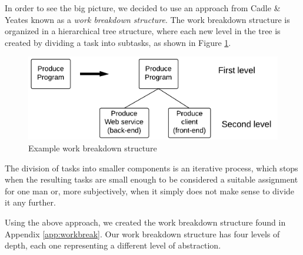 In order to see the big picture, we decided to use an approach from Cadle \& Yeates\cite[ch.~8.3.1]{caye} known as a \emph{work breakdown structure}. The work breakdown structure is organized in a hierarchical tree structure, where each new level in the tree is created by dividing a task into subtasks, as shown in Figure \ref{fig:breakdown}.

\begin{figure}[hbtp]
    \centering
	\includegraphics[scale=0.25]{./Empiri/Planning/img/wbslevels.png}
	\caption{Example work breakdown structure} \label{fig:breakdown}
\end{figure}

The division of tasks into smaller components is an iterative process, which stops when the resulting tasks are small enough to be considered a suitable assignment for one man or, more subjectively, when it simply does not make sense to divide it any further.

Using the above approach, we created the work breakdown structure found in Appendix \ref{app:workbreak}. Our work breakdown structure has four levels of depth, each one representing a different level of abstraction.